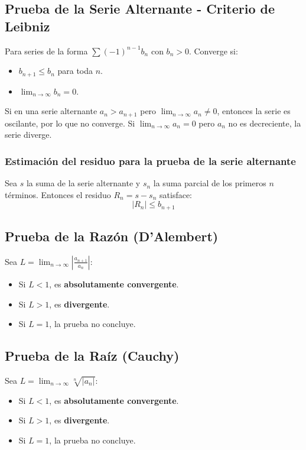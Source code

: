 \documentclass[a4paper,12pt]{article}
\begin{document}
\subsection{Prueba de la Serie Alternante - Criterio de Leibniz}
Para series de la forma $\sum (-1)^{n-1} b_n$ con $b_n > 0$. Converge si:
\begin{itemize}
    \item $b_{n+1} \leqslant b_n$ para toda $n$.
    \item $\lim_{n \to \infty} b_n = 0$.
\end{itemize}

\begin{tcolorbox}
    Si en una serie alternante $a_n > a_{n+1}$ pero $\lim_{n \to \infty} a_n \neq 0$, entonces la serie es  oscilante, por lo que no converge.\newline
    Si $\lim_{n \to \infty} a_n = 0$ pero $a_n$ no es decreciente, la serie diverge.
\end{tcolorbox}

\subsubsection{Estimación del residuo para la prueba de la serie alternante}
Sea $s$ la suma de la serie alternante y $s_n$ la suma parcial de los primeros $n$ términos. Entonces el residuo $R_n = s - s_n$ satisface:
$$ |R_n| \leqslant b_{n+1} $$

\subsection{Prueba de la Razón (D'Alembert)}
Sea $L = \lim_{n \to \infty} | \frac{a_{n+1}}{a_n} |$:
\begin{itemize}
    \item Si $L < 1$, es \textbf{absolutamente convergente}.
    \item Si $L > 1$, es \textbf{divergente}.
    \item Si $L = 1$, la prueba no concluye.
\end{itemize}

\subsection{Prueba de la Raíz (Cauchy)}
Sea $L = \lim_{n \to \infty} \sqrt[n]{|a_n|}$:
\begin{itemize}
    \item Si $L < 1$, es \textbf{absolutamente convergente}.
    \item Si $L > 1$, es \textbf{divergente}.
    \item Si $L = 1$, la prueba no concluye.
\end{itemize}
\end{document}
